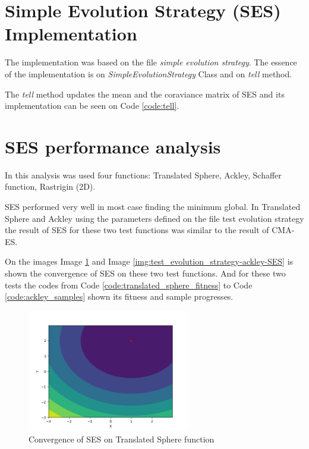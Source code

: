 \section{Simple Evolution Strategy (SES) Implementation}

The implementation was based on the file \textit{simple evolution strategy}. The essence of the implementation is on \textit{SimpleEvolutionStrategy} Class and on \textit{tell} method.

The \textit{tell} method updates the mean and the coraviance matrix of SES and its implementation can be seen on Code \ref{code:tell}.



\section{SES performance analysis}

In this analysis was used four functions: Translated Sphere, Ackley, Schaffer function, Rastrigin (2D).

SES performed very well in most case finding the minimum global. In Translated Sphere and Ackley using the parameters defined on the file test evolution strategy the result of SES for these two test functions was similar to the result of CMA-ES.

On the images Image \ref{img:test_evolution_strategy-translated_sphere-SES} and Image \ref{img:test_evolution_strategy-ackley-SES} is shown the convergence of SES on these two test functions. And for these two tests the codes from Code \ref{code:translated_sphere_fitness} to Code \ref{code:ackley_samples} shown its fitness and sample progresses.

\begin{figure}
  \begin{center}
  \includegraphics[width=2.8in]{./../code/test_evolution_strategy_results/test_evolution_strategy-translated_sphere-SES.png}
  \caption{Convergence of SES on Translated Sphere function}
  \label{img:test_evolution_strategy-translated_sphere-SES}
  \end{center}
\end{figure}

